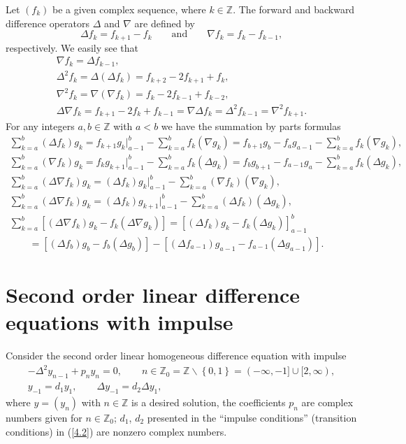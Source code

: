 \documentclass[11pt]{article}
\numberwithin{equation}{section}
\begin{document}
Let $(f_{k})$ be a given complex sequence, where $k\in
\mathbb{Z}.$ The forward and backward dif\/ference operators $\Delta $ and $\nabla $ are
def\/ined by%
\[
\Delta f_{k}=f_{k+1}-f_{k}\qquad \text{and} \qquad \nabla f_{k}=f_{k}-f_{k-1},
\]%
respectively. We easily see that%
\begin{gather*}
\nabla f_{k}=\Delta f_{k-1},
\\
\Delta ^{2}f_{k}=\Delta (\Delta f_{k})=f_{k+2}-2f_{k+1}+f_{k},
\\
\nabla ^{2}f_{k}=\nabla (\nabla f_{k})=f_{k}-2f_{k-1}+f_{k-2},
\\
\Delta \nabla f_{k}=f_{k+1}-2f_{k}+f_{k-1}=\nabla \Delta f_{k}=\Delta
^{2}f_{k-1}=\nabla ^{2}f_{k+1}.
\end{gather*}
For any integers $a,b\in
\mathbb{Z}
$ with $a<b$ we have the summation by parts formulas%
\begin{gather}
\sum_{k=a}^{b}(\Delta f_{k})g_{k}=f_{k+1}g_{k}\big|_{a-1}^{b}-\sum_{k=a}^{b}f_{k}(\nabla
g_{k})=f_{b+1}g_{b}-f_{a}g_{a-1}-\sum_{k=a}^{b}f_{k}(\nabla g_{k}),
\nonumber\\
\sum_{k=a}^{b}(\nabla f_{k})g_{k}=f_{k}g_{k+1}\big|_{a-1}^{b}-\sum_{k=a}^{b}f_{k}(\Delta
g_{k})=f_{b}g_{b+1}-f_{a-1}g_{a}-\sum_{k=a}^{b}f_{k}(\Delta g_{k}),
\label{3.1}
\\
\sum_{k=a}^{b}(\Delta \nabla f_{k})g_{k}=(\Delta f_{k})g_{k}\big|_{a-1}^{b}-\sum_{k=a}^{b}(\nabla f_{k})(\nabla g_{k}),  \label{3.2}
\\
\sum_{k=a}^{b}(\Delta \nabla f_{k})g_{k}=(\Delta f_{k})g_{k+1}\big|_{a-1}^{b}-\sum_{k=a}^{b}(\Delta f_{k})(\Delta g_{k}),  \nonumber %
\\
\sum_{k=a}^{b}[(\Delta \nabla f_{k})g_{k}-f_{k}(\Delta \nabla
g_{k})]=[(\Delta f_{k})g_{k}-f_{k}(\Delta g_{k})]_{a-1}^{b}
\nonumber\\
\qquad{}
=[(\Delta f_{b})g_{b}-f_{b}(\Delta g_{b})]-[(\Delta
f_{a-1})g_{a-1}-f_{a-1}(\Delta g_{a-1})].  \label{3.4}
\end{gather}
\setcounter{section}{3}
\setcounter{subsection}{0}
\setcounter{subsubsection}{0}
\setcounter{equation}{6}
\setcounter{theorem}{2}
\section[Second order linear difference equations with impulse]{Second order linear dif\/ference equations with impulse}\label{section4}

Consider the second order linear homogeneous dif\/ference equation with impulse%
\begin{gather}
-\Delta ^{2}y_{n-1}+p_{n}y_{n}=0,\qquad n\in \mathbb{Z}_{0}=%
\mathbb{Z}
\backslash \left\{ 0,1\right\} =(-\infty ,-1]\cup \lbrack 2,\infty ),
\label{4.1}
\\
y_{-1}=d_{1}y_{1},\qquad \Delta y_{-1}=d_{2}\Delta y_{1},  \label{4.2}
\end{gather}%
where $y=\left( y_{n}\right) $ with $n\in \mathbb{Z}
$ is a desired solution, the coef\/f\/icients $p_{n}$ are complex numbers given
for $n\in
\mathbb{Z}
_{0}$; $d_{1}$, $d_{2}$ presented in the ``impulse conditions'' (transition
conditions) in (\ref{4.2}) are nonzero complex numbers.
\end{document}
